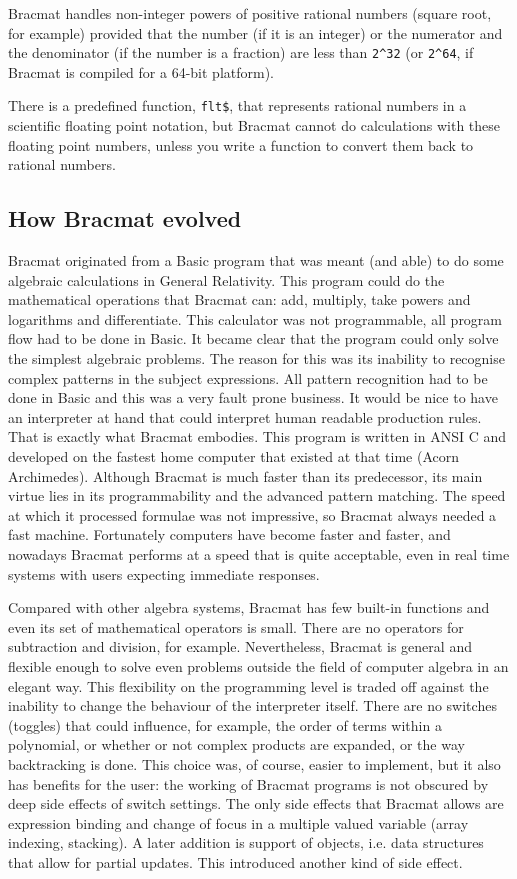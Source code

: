 \documentclass[12pt]{article}
\begin{document}
Bracmat handles non-integer powers of positive rational numbers
(square root, for example) provided that the number (if it is an
integer) or the numerator and the denominator (if the number is a
fraction) are less than \verb|2^32| (or \verb|2^64|, if Bracmat is compiled
for a 64-bit platform).

There is a predefined function, \verb|flt$|, that represents rational
numbers in a scientific floating point notation, but Bracmat cannot do
calculations with these floating point numbers, unless you write a
function to convert them back to rational numbers.

\subsection{How Bracmat evolved}

Bracmat originated from a Basic program that was meant (and able) to
do some algebraic calculations in General Relativity. This program
could do the mathematical operations that Bracmat can: add, multiply,
take powers and logarithms and differentiate. This calculator was not
programmable, all program flow had to be done in Basic. It became
clear that the program could only solve the simplest algebraic
problems. The reason for this was its inability to recognise complex
patterns in the subject expressions. All pattern recognition had to be
done in Basic and this was a very fault prone business. It would be
nice to have an interpreter at hand that could interpret human
readable production rules. That is exactly what Bracmat embodies. This
program is written in ANSI C and developed on the fastest home
computer that existed at that time (Acorn Archimedes). Although
Bracmat is much faster than its predecessor, its main virtue lies in
its programmability and the advanced pattern matching. The speed at
which it processed formulae was not impressive, so Bracmat always
needed a fast machine. Fortunately computers have become faster and
faster, and nowadays Bracmat performs at a speed that is quite
acceptable, even in real time systems with users expecting immediate
responses.

Compared with other algebra systems, Bracmat has few built-in
functions and even its set of mathematical operators is small. There
are no operators for subtraction and division, for
example. Nevertheless, Bracmat is general and flexible enough to solve
even problems outside the field of computer algebra in an elegant
way. This flexibility on the programming level is traded off against
the inability to change the behaviour of the interpreter itself. There
are no switches (toggles) that could influence, for example, the order
of terms within a polynomial, or whether or not complex products are
expanded, or the way backtracking is done. This choice was, of course,
easier to implement, but it also has benefits for the user: the
working of Bracmat programs is not obscured by deep side effects of
switch settings. The only side effects that Bracmat allows are
expression binding and change of focus in a multiple valued variable
(array indexing, stacking). A later addition is support of objects,
i.e. data structures that allow for partial updates. This introduced
another kind of side effect.
\end{document}
